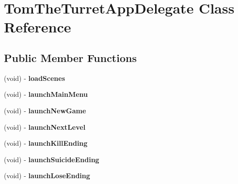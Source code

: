 \hypertarget{interface_tom_the_turret_app_delegate}{\section{Tom\-The\-Turret\-App\-Delegate Class Reference}
\label{interface_tom_the_turret_app_delegate}
}
\subsection*{Public Member Functions}
\begin{DoxyCompactItemize}
\item 
\hypertarget{interface_tom_the_turret_app_delegate_a7ee3a2b26079aa0ab6a98ca2353f3f7a}{(void) -\/ {\bfseries load\-Scenes}}\label{interface_tom_the_turret_app_delegate_a7ee3a2b26079aa0ab6a98ca2353f3f7a}

\item 
\hypertarget{interface_tom_the_turret_app_delegate_a8c3200b9484ffe629eaac77dcb514e3c}{(void) -\/ {\bfseries launch\-Main\-Menu}}\label{interface_tom_the_turret_app_delegate_a8c3200b9484ffe629eaac77dcb514e3c}

\item 
\hypertarget{interface_tom_the_turret_app_delegate_aed290c07ec451ee721230529c43160e8}{(void) -\/ {\bfseries launch\-New\-Game}}\label{interface_tom_the_turret_app_delegate_aed290c07ec451ee721230529c43160e8}

\item 
\hypertarget{interface_tom_the_turret_app_delegate_a2f3bbe0bbffc55420e0b0305ae36248e}{(void) -\/ {\bfseries launch\-Next\-Level}}\label{interface_tom_the_turret_app_delegate_a2f3bbe0bbffc55420e0b0305ae36248e}

\item 
\hypertarget{interface_tom_the_turret_app_delegate_a73fab85261ae928405fc1ba490d587f4}{(void) -\/ {\bfseries launch\-Kill\-Ending}}\label{interface_tom_the_turret_app_delegate_a73fab85261ae928405fc1ba490d587f4}

\item 
\hypertarget{interface_tom_the_turret_app_delegate_a3bbe39cfc44011d85b4fa7a9eb44145f}{(void) -\/ {\bfseries launch\-Suicide\-Ending}}\label{interface_tom_the_turret_app_delegate_a3bbe39cfc44011d85b4fa7a9eb44145f}

\item 
\hypertarget{interface_tom_the_turret_app_delegate_a5e7e8895bdd2618c0c9f5bf60727f224}{(void) -\/ {\bfseries launch\-Lose\-Ending}}\label{interface_tom_the_turret_app_delegate_a5e7e8895bdd2618c0c9f5bf60727f224}

\end{DoxyCompactItemize}
